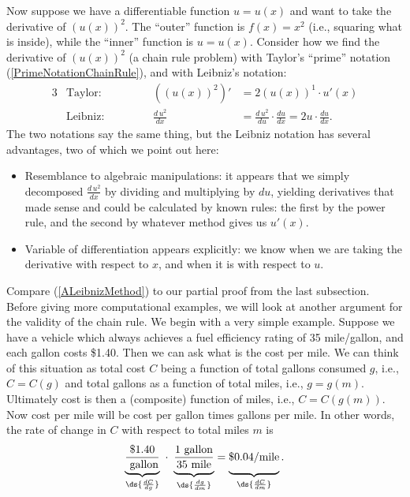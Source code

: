 Now suppose we have a differentiable function $u=u(x)$ and want to take
the derivative of $\left(u(x)\right)^2$. The ``outer''
function is $f(x)=x^2$ (i.e., squaring what is inside),
while the ``inner'' function is $u=u(x)$.  Consider
how we find the derivative of $(u(x))^2$ (a chain rule problem)
with Taylor's ``prime'' notation (\ref{PrimeNotationChainRule}), and with
Leibniz's notation:
\begin{alignat}{3}
&\text{Taylor:}&&\qquad&\left((u(x))^2\right)'&=2(u(x))^1\cdot u'(x)\\
&\text{Leibniz:}&&&\frac{d\,u^2}{dx}&=\frac{d\,u^2}{du}\cdot\frac{du}{dx}
=2u\cdot\frac{du}{dx}.\label{ALeibnizMethod}
\end{alignat}
The two notations say the same thing, but the Leibniz notation 
has several advantages, two of which we point out here:
\begin{itemize}
\item  Resemblance to algebraic manipulations: it appears
that we simply decomposed  $\frac{d\,u^2}{dx}$ by
dividing and multiplying by
$du$, yielding derivatives that made sense and could be
calculated by known rules: the first by the power rule,
and the second by whatever method gives us $u'(x)$.
\item Variable of differentiation appears explicitly:
we know when we are taking the derivative with respect
to $x$, and when it is with respect to $u$.  
\end{itemize}
Compare (\ref{ALeibnizMethod})  to our partial proof from the last subsection.
Before giving more computational examples, we will look at another argument
for the validity of the chain rule.  We begin with a very simple example. 
\bex
Suppose we have a vehicle
which always achieves a fuel efficiency rating of 35 mile/gallon,
and each gallon costs \$1.40.  Then we can ask
what is the cost per mile.  We can think of this situation
as total cost $C$ being a function of total gallons consumed $g$,
i.e., $C=C(g)$  and total
gallons as a function of total miles, i.e., $g=g(m)$.
Ultimately cost is then a (composite) function of miles,
i.e., $C=C(g(m))$.  Now cost per mile will be cost per gallon
times gallons per mile.  In other words, the  rate of change in $C$
with respect to total miles $m$ is
\begin{equation}
\underbrace{\frac{\$1.40}{\text{ gallon}}}_{\ds{\frac{dC}{dg}}}
\ \cdot\ 
\underbrace{\frac{1\text{ gallon}}
{35\text{\vphantom{g} mile}}}_{\ds{\frac{dg}{dm}}}
=\underbrace{
\vphantom{\frac{\$1.40}{\text{ gallon}}}
\$0.04/\text{mile}}_{\ds{\frac{dC}{dm}}}.
\label{DollarsPerMileExampleEquation}\end{equation}
